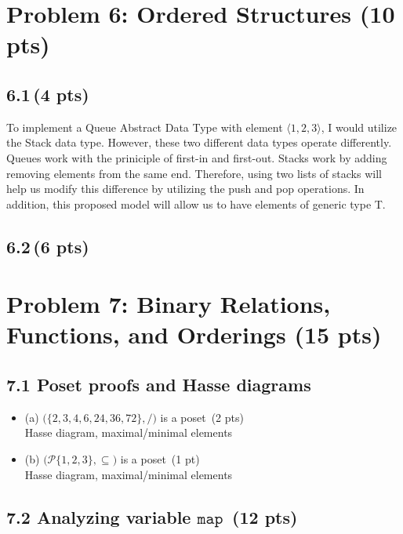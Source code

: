 \documentclass[12pt]{article}
\begin{document}
\section{Problem 6: Ordered Structures (10 pts)}

\subsection*{6.1\,(4 pts)}

To implement a Queue Abstract Data Type with element  $\langle 1,2,3 \rangle$, I would utilize the Stack data type. However, these two different data types operate differently. Queues work with the priniciple of first-in and first-out. Stacks work by adding removing elements from the same end. Therefore, using two lists of stacks will help us modify this difference by utilizing the push and pop operations. In addition, this proposed model will allow us to have elements of generic type T.

\subsection*{6.2\,(6 pts)}


\newpage
\section{Problem 7: Binary Relations, Functions, and Orderings (15 pts)}

\subsection*{7.1 Poset proofs and Hasse diagrams}
\begin{itemize}
    \item (a) \(\bigl(\{2,3,4,6,24,36,72\}, /\bigr)\) is a poset \,(2 pts) \\
          Hasse diagram, maximal/minimal elements
    \item (b) \(\bigl(\mathcal{P}\{1,2,3\}, \subseteq\bigr)\) is a poset \,(1 pt) \\
          Hasse diagram, maximal/minimal elements
\end{itemize}

\subsection*{7.2 Analyzing variable \(\texttt{map}\) \,(12 pts)}
\end{document}
